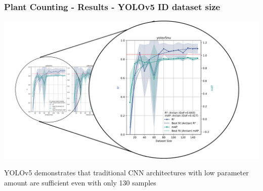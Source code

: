 \documentclass[aspectratio=43]{beamer}
\begin{document}
\begin{frame}
    \frametitle{\small Plant Counting - Results - YOLOv5 ID dataset size}
    
    \begin{center}
        \includegraphics[width=1\textwidth]{Imgs/r2_ap_vs_dataset_size_yolov5_2.pdf}
    \end{center}
    
    YOLOv5 demonstrates that traditional CNN architectures with low parameter amount are sufficient even with only 130 samples

\end{frame}
\end{document}
